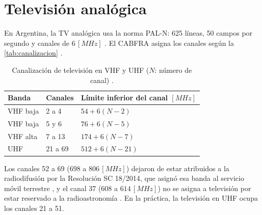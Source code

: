 \section{Televisión analógica}
\label{sec:tv_analogica}

En Argentina, la TV analógica usa la norma PAL-N: 625 líneas, 50 campos por segundo y canales de $6 \, [MHz]$ \cite{itu_bt470}. El CABFRA asigna los canales según la \autoref{tab:canalizacion} \cite{cabfra}.

\begin{table}[H]
    \centering
    \caption{Canalización de televisión en VHF y UHF ($N$: número de canal) \cite{enacom_canalizacion_tv}.}
    \label{tab:canalizacion}
    \begin{tabular}{l l l}
        \toprule
        \textbf{Banda} & \textbf{Canales} & \textbf{Límite inferior del canal $[MHz]$} \\
        \midrule
        VHF baja & 2 a 4 & $54 + 6 (N - 2)$ \\
        VHF baja & 5 y 6 & $76 + 6 (N - 5)$ \\
        VHF alta & 7 a 13 & $174 + 6 (N - 7)$ \\
        UHF & 21 a 69 & $512 + 6 (N - 21)$ \\
        \bottomrule
    \end{tabular}
\end{table}

Los canales 52 a 69 ($698$ a $806 \, [MHz]$) dejaron de estar atribuidos a la radiodifusión por la Resolución SC 18/2014, que asignó esa banda al servicio móvil terrestre \cite{res_sc18_2014}, y el canal 37 ($608$ a $614 \, [MHz]$) no se asigna a televisión por estar reservado a la radioastronomía \cite{enacom_canalizacion_tv}. En la práctica, la televisión en UHF ocupa los canales 21 a 51.

